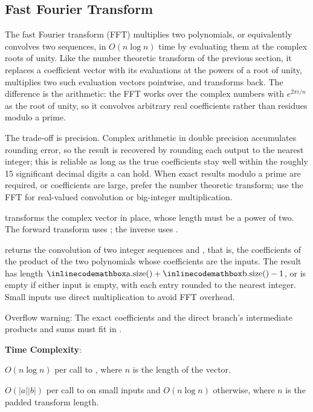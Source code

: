 \subsection{Fast Fourier Transform}
\label{sec:6.6.2}
The fast Fourier transform (FFT) multiplies two polynomials, or equivalently convolves two sequences, in $O(n \log n)$ time by evaluating them at the complex roots of unity. Like the number theoretic transform of the previous section, it replaces a coefficient vector with its evaluations at the powers of a root of unity, multiplies two such evaluation vectors pointwise, and transforms back. The difference is the arithmetic: the FFT works over the complex numbers with $e^{2\pi i / n}$ as the root of unity, so it convolves arbitrary real coefficients rather than residues modulo a prime.

The trade-off is precision. Complex arithmetic in double precision accumulates rounding error, so the result is recovered by rounding each output to the nearest integer; this is reliable as long as the true coefficients stay well within the roughly 15 significant decimal digits a  can hold. When exact results modulo a prime are required, or coefficients are large, prefer the number theoretic transform; use the FFT for real-valued convolution or big-integer multiplication.

\begin{compactitem}
  \item {} transforms the complex vector  in place, whose length must be a power of two. The forward transform uses ; the inverse uses .
  \item {} returns the convolution of two integer sequences  and , that is, the coefficients of the product of the two polynomials whose coefficients are the inputs. The result has length ${\inlinecodemath{a.size()}} + {\inlinecodemath{b.size()}} - 1$, or is empty if either input is empty, with each entry rounded to the nearest integer. Small inputs use direct multiplication to avoid FFT overhead.
\end{compactitem}

Overflow warning: The exact coefficients and the direct branch's intermediate products and sums must fit in .

\textbf{Time Complexity}:
\begin{compactitem}
  \item $O(n \log n)$ per call to , where $n$ is the length of the vector.
  \item $O(|a||b|)$ per call to  on small inputs and $O(n \log n)$ otherwise, where $n$ is the padded transform length.
\end{compactitem}

